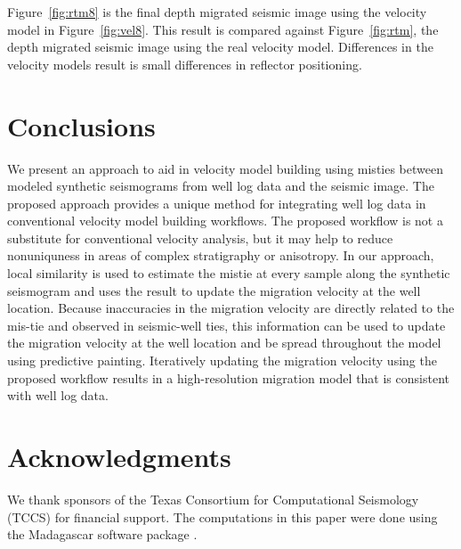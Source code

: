 
Figure~\ref{fig:rtm8} is the final depth migrated seismic image using the velocity model in Figure~\ref{fig:vel8}. This result is compared against Figure~\ref{fig:rtm}, the depth migrated seismic image using the real velocity model. Differences in the velocity models result is small differences in reflector positioning.


\section{Conclusions}
We present an approach to aid in velocity model building using misties between modeled synthetic seismograms from well log data and the seismic image. The proposed approach provides a unique method for integrating well log data in conventional velocity model building workflows. The proposed workflow is not a substitute for conventional velocity analysis, but it may help to reduce nonuniquness in areas of complex stratigraphy or anisotropy. In our approach, local similarity is used to estimate the mistie at every sample along the synthetic seismogram and uses the result to update the migration velocity at the well location. Because inaccuracies in the migration velocity are directly related to the mis-tie and observed in seismic-well ties, this information can be used to update the migration velocity at the well location and be spread throughout the model using predictive painting. Iteratively updating the migration velocity using the proposed workflow results in a high-resolution migration model that is consistent with well log data.

\section{Acknowledgments}
We thank sponsors of the Texas Consortium for Computational Seismology (TCCS) for financial support. The computations in this paper were done using the Madagascar software package \cite[]{fomel2013repeat}.

\onecolumn


